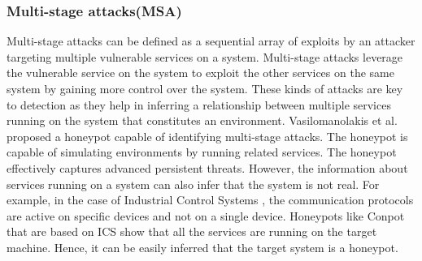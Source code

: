 \subsubsection{Multi-stage attacks(MSA)}
Multi-stage attacks can be defined as a sequential array of exploits by an attacker targeting multiple vulnerable services on a system. Multi-stage attacks leverage the vulnerable service on the system to exploit the other services on the same system by gaining more control over the system. These kinds of attacks are key to detection as they help in inferring a relationship between multiple services running on the system that constitutes an environment. Vasilomanolakis et al. \cite{vasilomanolakis} proposed a honeypot capable of identifying multi-stage attacks. The honeypot is capable of simulating environments by running related services. The honeypot effectively captures advanced persistent threats. However, the information about services running on a system can also infer that the system is not real. For example, in the case of Industrial Control Systems , the communication protocols are active on specific devices and not on a single device. Honeypots like Conpot that are based on ICS show that all the services are running on the target machine. Hence, it can be easily inferred that the target system is a honeypot. 


